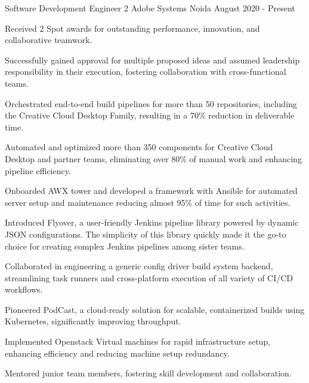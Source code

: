 

\begin{cventries}

\cventry
    {Software Development Engineer 2} %
    {Adobe Systems} %
    {Noida} %
    {August 2020 - Present} %
    {
    \begin{cvitems}
        \item Received 2 Spot awards for outstanding performance, innovation, and collaborative teamwork.
        \item Successfully gained approval for multiple proposed ideas and assumed leadership responsibility in their execution, fostering collaboration with cross-functional teams.
        \item Orchestrated end-to-end build pipelines for more than 50 repositories, including the Creative Cloud Desktop Family, resulting in a 70\% reduction in deliverable time.
        \item Automated and optimized more than 350 components for Creative Cloud Desktop and partner teams, eliminating over 80\% of manual work and enhancing pipeline efficiency.
        \item Onboarded AWX tower and developed a framework with Ansible for automated server setup and maintenance reducing almost 95\% of time for such activities.
        \item Introduced Flyover, a user-friendly Jenkins pipeline library powered by dynamic JSON configurations. The simplicity of this library quickly made it the go-to choice for creating complex Jenkins pipelines among sister teams.
        \item Collaborated in engineering a generic config driver build system backend, streamlining task runners and cross-platform execution of all variety of CI/CD workflows.
        \item Pioneered PodCast, a cloud-ready solution for scalable, containerized builds using Kubernetes, significantly improving throughput.
        \item Implemented Openstack Virtual machines for rapid infrastructure setup, enhancing efficiency and reducing machine setup redundancy.
        \item Mentored junior team members, fostering skill development and collaboration.
    \end{cvitems}
    }


\end{cventries}
